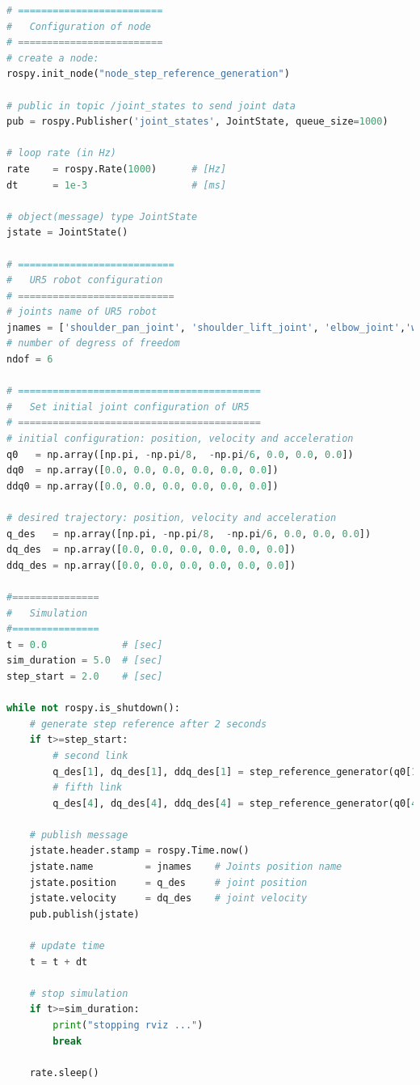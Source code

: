 \begin{lstlisting}[language=Python, caption={Move the second and fifth joint of UR5 robot with the required movement of activity 1.2.}, label={lst:rosnode_step_reference_generator}]
# =========================
#   Configuration of node
# =========================
# create a node: 
rospy.init_node("node_step_reference_generation")

# public in topic /joint_states	to send joint data	
pub = rospy.Publisher('joint_states', JointState, queue_size=1000)

# loop rate (in Hz)
rate 	= rospy.Rate(1000)		# [Hz]
dt 		= 1e-3					# [ms]

# object(message) type JointState
jstate = JointState()

# ===========================
#   UR5 robot configuration
# ===========================
# joints name of UR5 robot
jnames = ['shoulder_pan_joint', 'shoulder_lift_joint', 'elbow_joint','wrist_1_joint', 'wrist_2_joint', 'wrist_3_joint']
# number of degress of freedom
ndof = 6

# ==========================================
#   Set initial joint configuration of UR5
# ==========================================
# initial configuration: position, velocity and acceleration 
q0   = np.array([np.pi, -np.pi/8,  -np.pi/6, 0.0, 0.0, 0.0])
dq0  = np.array([0.0, 0.0, 0.0, 0.0, 0.0, 0.0])
ddq0 = np.array([0.0, 0.0, 0.0, 0.0, 0.0, 0.0]) 

# desired trajectory: position, velocity and acceleration
q_des   = np.array([np.pi, -np.pi/8,  -np.pi/6, 0.0, 0.0, 0.0])
dq_des  = np.array([0.0, 0.0, 0.0, 0.0, 0.0, 0.0])
ddq_des = np.array([0.0, 0.0, 0.0, 0.0, 0.0, 0.0])

#===============
#   Simulation
#===============
t = 0.0             # [sec] 
sim_duration = 5.0  # [sec]
step_start = 2.0    # [sec]

while not rospy.is_shutdown():
    # generate step reference after 2 seconds
    if t>=step_start:
        # second link
        q_des[1], dq_des[1], ddq_des[1] = step_reference_generator(q0[1],-0.4)
        # fifth link
        q_des[4], dq_des[4], ddq_des[4] = step_reference_generator(q0[4], 0.5)

    # publish message
    jstate.header.stamp = rospy.Time.now()
    jstate.name 		= jnames    # Joints position name
    jstate.position 	= q_des     # joint position
    jstate.velocity 	= dq_des    # joint velocity
    pub.publish(jstate)

    # update time
    t = t + dt
    
    # stop simulation    
    if t>=sim_duration:
        print("stopping rviz ...")
        break

    rate.sleep()

\end{lstlisting}


